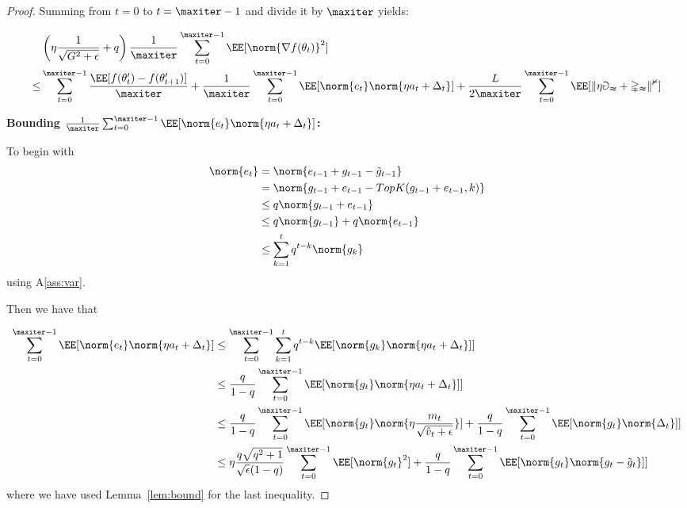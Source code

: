 \documentclass[11pt]{article}
\begin{document}
\begin{proof}
Summing from $t = 0$ to $t = \maxiter -1$ and divide it by $\maxiter$ yields:


\begin{equation}\label{eq:mainsingle}
\begin{split}
&  \left( \eta\frac{1}{\sqrt{G^2+\epsilon}} + q \right) \frac{1}{\maxiter}\sum_{t=0}^{\maxiter -1} \EE[\norm{\nabla f(\theta_t)}^2]  \\
\leq &\sum_{t=0}^{\maxiter -1}\frac{\EE[f(\theta_t') -f(\theta_{t+1}')]}{\maxiter}  +  \frac{1}{\maxiter}\sum_{t=0}^{\maxiter -1}  \EE[\norm{e_t}\norm{\eta a_t + \Delta_t}]+  \frac{L}{2\maxiter}\sum_{t=0}^{\maxiter -1} \mathbb \EE[\|\eta a_t + \Delta_t\|^2]
\end{split}
\end{equation}


\textbf{Bounding $\frac{1}{\maxiter}\sum_{t=0}^{\maxiter -1}  \EE[\norm{e_t}\norm{\eta a_t + \Delta_t}]$:}

To begin with
\begin{equation}\label{eq:ineqe_t}
\begin{split}
\norm{e_t} & = \norm{e_{t-1} + g_{t-1} - \tilde g_{t-1}}\\
& =  \norm{ g_{t-1} + e_{t-1} - TopK(g_{t-1}+e_{t-1},k)}\\
& \leq q \norm{g_{t-1} + e_{t-1}}\\
& \leq q \norm{g_{t-1}} +q \norm{ e_{t-1}}\\
& \leq \sum_{k=1}^t q^{t-k} \norm{g_{k}} 
\end{split}
\end{equation}
using A\ref{ass:var}.

Then we have that

\begin{align*}
\sum_{t=0}^{\maxiter -1}  \EE[\norm{e_t}\norm{\eta a_t + \Delta_t}] &\leq  \sum_{t=0}^{\maxiter -1}\sum_{k=1}^t q^{t-k}\EE[\norm{g_{k}} \norm{\eta a_t + \Delta_t}]]\\
& \leq \frac{q}{1-q}\sum_{t=0}^{\maxiter -1}\EE[\norm{g_{t}} \norm{\eta a_t + \Delta_t}]]\\
& \leq \frac{q}{1-q}\sum_{t=0}^{\maxiter -1}\EE[\norm{g_{t}} \norm{\eta \frac{m_t}{\sqrt{\hat v_t+\epsilon}}}] +\frac{q}{1-q} \sum_{t=0}^{\maxiter -1}\EE[\norm{g_{t}} \norm{\Delta_t}]]\\
& \leq \eta \frac{q\sqrt{q^2+1}}{\sqrt{\epsilon}(1-q)}  \sum_{t=0}^{\maxiter -1}\EE[\norm{g_{t}}^2]  +\frac{q}{1-q} \sum_{t=0}^{\maxiter -1}\EE[\norm{g_{t}} \norm{g_t - \tilde g_t}]]
\end{align*}
where we have used Lemma~\ref{lem:bound} for the last inequality.


\end{proof}
\end{document}
